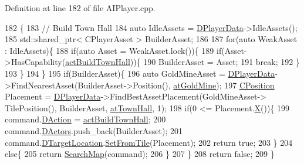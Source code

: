 Definition at line 182 of file A\+I\+Player.\+cpp.


\begin{DoxyCode}
182                                                            \{
183     \textcolor{comment}{// Build Town Hall}
184     \textcolor{keyword}{auto} IdleAssets = \hyperlink{classCAIPlayer_a83b5113c8f7e80df54940b647c5ee2e6}{DPlayerData}->IdleAssets();
185     std::shared\_ptr< CPlayerAsset > BuilderAsset;
186     
187     \textcolor{keywordflow}{for}(\textcolor{keyword}{auto} WeakAsset : IdleAssets)\{
188         \textcolor{keywordflow}{if}(\textcolor{keyword}{auto} Asset = WeakAsset.lock())\{
189             \textcolor{keywordflow}{if}(Asset->HasCapability(\hyperlink{GameDataTypes_8h_a35b98ce26aca678b03c6f9f76e4778cea0b5f001e8c77b8a87998da6320595498}{actBuildTownHall}))\{
190                 BuilderAsset = Asset;
191                 \textcolor{keywordflow}{break};
192             \}
193         \}
194     \}
195     \textcolor{keywordflow}{if}(BuilderAsset)\{
196         \textcolor{keyword}{auto} GoldMineAsset = \hyperlink{classCAIPlayer_a83b5113c8f7e80df54940b647c5ee2e6}{DPlayerData}->FindNearestAsset(BuilderAsset->Position(), 
      \hyperlink{GameDataTypes_8h_a5600d4fc433b83300308921974477feca243d9ba44092eadd561db058d742b3b3}{atGoldMine});
197         \hyperlink{classCPosition}{CPosition} Placement = \hyperlink{classCAIPlayer_a83b5113c8f7e80df54940b647c5ee2e6}{DPlayerData}->FindBestAssetPlacement(GoldMineAsset->
      TilePosition(), BuilderAsset, \hyperlink{GameDataTypes_8h_a5600d4fc433b83300308921974477feca5c0fa8a0f367f3358365536d3c7aa321}{atTownHall}, 1);
198         \textcolor{keywordflow}{if}(0 <= Placement.\hyperlink{classCPosition_a9a6b94d3b91df1492d166d9964c865fc}{X}())\{
199             command.\hyperlink{structSPlayerCommandRequest_a80897bbccf2c4e0b148a7aa815a926c6}{DAction} = \hyperlink{GameDataTypes_8h_a35b98ce26aca678b03c6f9f76e4778cea0b5f001e8c77b8a87998da6320595498}{actBuildTownHall};
200             command.\hyperlink{structSPlayerCommandRequest_aa37fc01519676345703d78b9f573894a}{DActors}.push\_back(BuilderAsset);
201             command.\hyperlink{structSPlayerCommandRequest_a701702b94ca2fd2738e95ef6711dd41a}{DTargetLocation}.\hyperlink{classCPosition_a46994e6a8b8e3b4237edd7259ad844b6}{SetFromTile}(Placement);
202             \textcolor{keywordflow}{return} \textcolor{keyword}{true};
203         \}
204         \textcolor{keywordflow}{else}\{
205             \textcolor{keywordflow}{return} \hyperlink{classCAIPlayer_afafbe8fc589e09a16ae1f02f2794d7b0}{SearchMap}(command);  
206         \}
207     \}
208     \textcolor{keywordflow}{return} \textcolor{keyword}{false};
209 \}
\end{DoxyCode}
